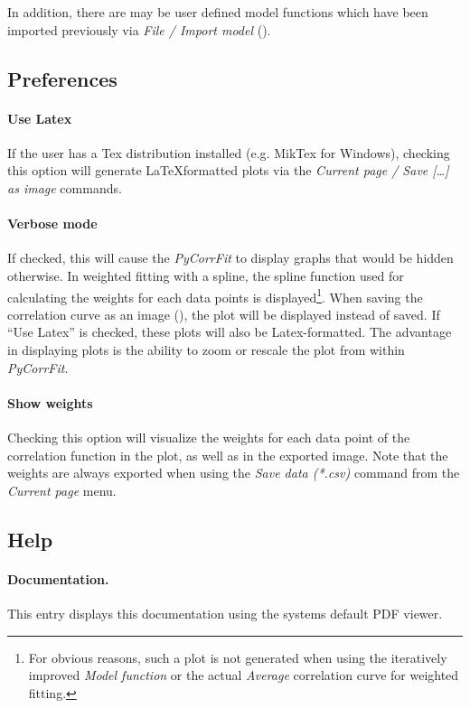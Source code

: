 \noindent
In addition, there are may be user defined model functions which have been imported previously via \textit{File / Import model} ().

\subsection{Preferences}
\label{sec:menub.prefe}
\paragraph*{Use Latex} If the user has a Tex distribution installed (e.g. MikTex for Windows), checking this option will generate \LaTeX formatted plots via the \textit{Current page / Save […] as image} commands.

\paragraph*{Verbose mode} If checked, this will cause the \textit{PyCorrFit} to display graphs that would be hidden otherwise. In weighted fitting with a spline, the spline function used for calculating the weights for each data points is displayed\footnote{For obvious reasons, such a plot is not generated when using the iteratively improved \textit{Model function} or the actual \textit{Average} correlation curve for weighted fitting.}. When saving the correlation curve as an image (), the plot will be displayed instead of saved. If  ``Use Latex'' is checked, these plots will also be Latex-formatted. The advantage in displaying plots is the ability to zoom or rescale the plot from within \textit{PyCorrFit}.

\paragraph*{Show weights}
Checking this option will visualize the weights for each data point of the correlation function in the plot, as well as in the exported image. Note that the weights are always exported when using the \textit{Save data (*.csv)} command from the \textit{Current page} menu.

\subsection{Help}
\label{sec:menub.help}
\paragraph*{Documentation.}
This entry displays this documentation using the systems default PDF viewer.
